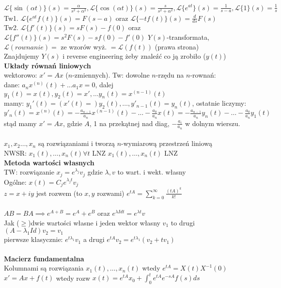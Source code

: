 \documentclass{article}
\begin{document}
$\mathcal{L}\{\sin{(\alpha t)}\}(s) = \frac{\alpha}{s^2 + \alpha^2},\mathcal{L}\{\cos{(\alpha t)}\}(s) = \frac{s}{s^2 + \alpha^2}, \mathcal{L}\{e^{at}\}(s) = \frac{1}{s-a}, \mathcal{L}\{1\}(s) = \frac{1}{s}$\\
Tw1. $\mathcal{L}\{e^{at}f(t)\}(s) = F(s-a)$ oraz $\mathcal{L}\{-tf(t)\}(s) = \frac{d}{ds}F(s)$\\
Tw2. $\mathcal{L}\{f'(t)\}(s) = sF(s) - f(0)$ oraz $\mathcal{L}\{f''(t)\}(s) = s^2F(s) - sf(0)-f'(0)$
$Y(s)$-transformata, $\mathcal{L}(rownanie) =$ ze wzorów wyż. $=\mathcal{L}(f(t))$ (prawa strona)\\
Znajdujemy $Y(s)$ i reverse engineering żeby znaleźć co ją zrobiło ($y(t)$)\\
\textbf{Układy równań liniowych}\\
wektorowo: $x' = Ax$ ($n$-zmiennych). Tw: dowolne $n$-rzędu na $n$-rownań:\\
dane: $a_nx^{(n)}(t) + \ldots a_1x = 0$, dalej $y_1(t) =x(t), y_2(t)=x', \ldots y_n(t)=x^{(n-1)}(t)$\\
mamy: $y_1'(t) = (x'(t) =) y_2(t), \ldots, y'_{n-1}(t) = y_n(t)$, ostatnie liczymy:
$y'_n(t) =x^{(n)}(t) = -\frac{a_{n-1}}{a_n}x^{(n-1)}(t) - \ldots -\frac{a_0}{a_n}x(t) = -\frac{a_{n-1}}{a_n}y_n(t) - \ldots -\frac{a_0}{a_n}y_1(t)$\\
stąd mamy $x'=Ax$, gdzie $A$, 1 na przekątnej nad diag, $-\frac{a_i}{a_n}$ w dolnym wierszu.\\\\
$x_1,x_2\ldots,x_n$ są rozwiązaniami i tworzą $n$-wymiarową przestrzeń liniową\\
NWSR: $x_1(t), \ldots, x_n(t) \forall t$ LNZ $x_1(t), \ldots, x_n(t)$ LNZ\\
\textbf{Metoda wartości własnych}\\
TW: rozwiązanie $x_j = e^{\lambda_j}v_j$ gdzie $\lambda, v$ to wart. i wekt. własny\\
Ogólne: $x(t) = C_je^{\lambda_jt}v_j$\\
$z = x + iy$ jest rozwem (to $x,y$ rozwami) \quad $e^{tA} = \sum_{k=0}^\infty \frac{(tA)^k}{k!}$\\
\\
$AB=BA \implies e^{A+B} = e^A+e^B$ oraz $e^{\lambda I dt} = e^{\lambda t}v$\\
Jak ($\geq$)dwie wartości własne i jeden wektor własny $v_1$ to drugi $(A-\lambda_1Id)v_2=v_1$\\
pierwsze klasycznie: $e^{t\lambda_1}v_1$ a drugi $e^{tA}v_2=e^{t\lambda_1}(v_2+tv_1)$\\\\
\textbf{Macierz fundamentalna}\\
Kolumnami są rozwiązania $x_1(t), \ldots, x_n(t)$ wtedy $e^{tA}=X(t)X^{-1}(0)$\\
$x'=Ax+f(t)$ wtedy rozw $x(t) = e^{tA}x_0 + \int_{0}^{t}e^{tA}e^{-sA}f(s)ds$
\end{document}
